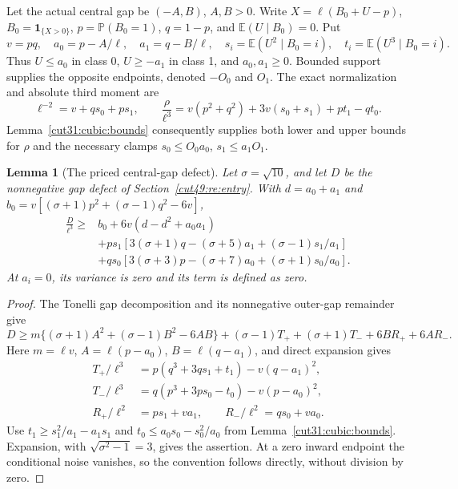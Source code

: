 \documentclass[11pt,a4paper]{article}
\numberwithin{equation}{section}
\newtheorem{lemma}[theorem]{Lemma}
\theoremstyle{definition}
\theoremstyle{remark}
\newcommand{\E}{\mathbb E}
\newcommand{\Pp}{\mathbb P}
\begin{document}
Let the actual central gap be \((-A,B)\), \(A,B>0\).
Write \(X=\ell(B_0+U-p)\), \(B_0=\mathbf1_{\{X>0\}}\),
\(p=\Pp(B_0=1)\), \(q=1-p\), and \(\E(U\mid B_0)=0\).
Put
\[
 v=pq,\quad a_0=p-A/\ell,\quad a_1=q-B/\ell,
 \quad s_i=\E(U^2\mid B_0=i),\quad t_i=\E(U^3\mid B_0=i).
\]
Thus \(U\le a_0\) in class 0, \(U\ge-a_1\) in class 1,
and \(a_0,a_1\ge0\). Bounded support supplies the opposite
endpoints, denoted \(-O_0\) and \(O_1\).
The exact normalization and absolute third moment are
\[
 \ell^{-2}=v+qs_0+ps_1,\qquad
 \frac\rho{\ell^3}=v(p^2+q^2)+3v(s_0+s_1)+pt_1-qt_0.
\]
Lemma~\ref{cut31:cubic:bounds} consequently supplies both lower
and upper bounds for \(\rho\) and the necessary clamps
\(s_0\le O_0a_0\), \(s_1\le a_1O_1\).

\begin{lemma}[The priced central-gap defect]\label{cut31:gap:priced}
Let \(\sigma=\sqrt{10}\), and let \(D\) be the nonnegative
gap defect of Section~\ref{cut49:re:entry}.
With \(d=a_0+a_1\) and
\(b_0=v[(\sigma+1)p^2+(\sigma-1)q^2-6v]\),
\begin{align*}
 \frac D{\ell^3}\ge{}&b_0+6v(d-d^2+a_0a_1)\\
 &+ps_1\left[3(\sigma+1)q-(\sigma+5)a_1
                    +(\sigma-1)s_1/a_1\right]\\
 &+qs_0\left[3(\sigma+3)p-(\sigma+7)a_0
                    +(\sigma+1)s_0/a_0\right].
\end{align*}
At \(a_i=0\), its variance is zero and its term is defined as zero.
\end{lemma}
\begin{proof}
The Tonelli gap decomposition and its nonnegative outer-gap
remainder give
\[
 D\ge m\{(\sigma+1)A^2+(\sigma-1)B^2-6AB\}
       +(\sigma-1)T_++(\sigma+1)T_-+6BR_++6AR_-.
\]
Here \(m=\ell v\), \(A=\ell(p-a_0)\),
\(B=\ell(q-a_1)\), and direct expansion gives
\[
 \begin{aligned}
 T_+/\ell^3&=p(q^3+3qs_1+t_1)-v(q-a_1)^2,\\
 T_-/\ell^3&=q(p^3+3ps_0-t_0)-v(p-a_0)^2,\\
 R_+/\ell^2&=ps_1+va_1,\qquad
 R_-/\ell^2=qs_0+va_0.
 \end{aligned}
\]
Use \(t_1\ge s_1^2/a_1-a_1s_1\) and
\(t_0\le a_0s_0-s_0^2/a_0\) from
Lemma~\ref{cut31:cubic:bounds}. Expansion, with
\(\sqrt{\sigma^2-1}=3\), gives the assertion.
At a zero inward endpoint the conditional noise vanishes, so the
convention follows directly, without division by zero.
\end{proof}
\end{document}
